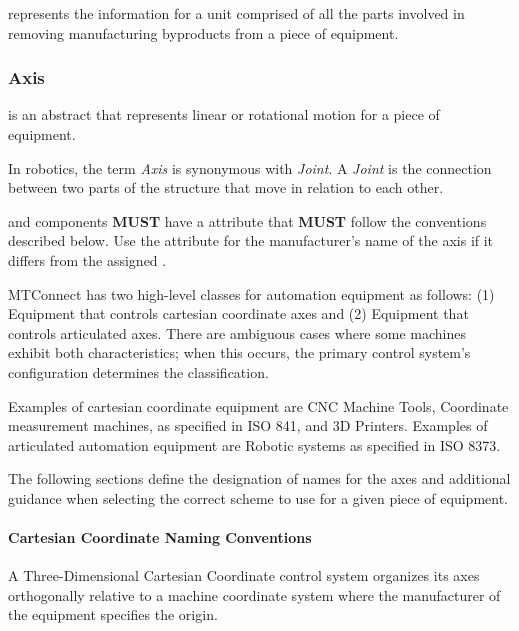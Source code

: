  represents the information for a unit comprised of all the parts involved in removing manufacturing byproducts from a piece of equipment.




\subsubsection{Axis}
\label{sec:Axis}



 is an abstract  that represents linear or rotational motion for a piece of equipment.

In robotics, the term \textit{Axis} is synonymous with \textit{Joint}. A \textit{Joint} is the connection between two parts of the structure that move in relation to each other.

 and  components \textbf{MUST} have a  attribute that \textbf{MUST} follow the conventions described below. Use the  attribute for the manufacturer's name of the axis if it differs from the assigned .

\gls{MTConnect} has two high-level classes for automation equipment as follows: (1) Equipment that controls cartesian coordinate axes and (2) Equipment that controls articulated axes. There are ambiguous cases where some machines exhibit both characteristics; when this occurs, the primary control system's configuration determines the classification.

Examples of cartesian coordinate equipment are CNC Machine Tools, Coordinate measurement machines, as specified in ISO 841, and 3D Printers. Examples of articulated automation equipment are Robotic systems as specified in ISO 8373.

The following sections define the designation of names for the axes and additional guidance when selecting the correct scheme to use for a given piece of equipment.

\paragraph{Cartesian Coordinate Naming Conventions}\mbox{}
\label{sec:Cartesian Coordinate Naming Conventions}

A Three-Dimensional Cartesian Coordinate control system organizes its axes orthogonally relative to a machine coordinate system where the manufacturer of the equipment specifies the origin. 

